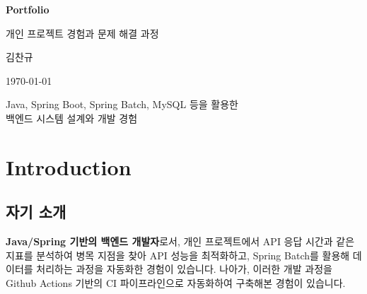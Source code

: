 \documentclass[12pt,a4paper]{article}
\begin{document}
    \begin{titlepage}
        \centering
        \vspace*{2cm}

        {\huge\bfseries Portfolio\par}
        \vspace{0.5cm}
        {\Large 개인 프로젝트 경험과 문제 해결 과정\par}

        \vspace{2cm}
        {\large 김찬규\par}

        \vspace{1cm}
        {\large \today\par}

        \vfill

        {\large
        Java, Spring Boot, Spring Batch, MySQL 등을 활용한\\
        백엔드 시스템 설계와 개발 경험
        \par}

    \end{titlepage}


    \tableofcontents
    \newpage



    \section{Introduction}
    \subsection{자기 소개}

    \begin{minipage}[t]{\textwidth}
        \setlength{\baselineskip}{16pt} %
        \fontsize{12}{14}\selectfont    %
        \hspace*{0.5em} \textbf{Java/Spring 기반의 백엔드 개발자}로서, 개인 프로젝트에서 API 응답 시간과 같은 지표를 분석하여 병목 지점을 찾아 API 성능을 최적화하고, Spring Batch를 활용해 데이터를 처리하는 과정을 자동화한 경험이 있습니다. 나아가, 이러한 개발 과정을 Github Actions 기반의 CI 파이프라인으로 자동화하여 구축해본 경험이 있습니다.
    \end{minipage}
\end{document}
